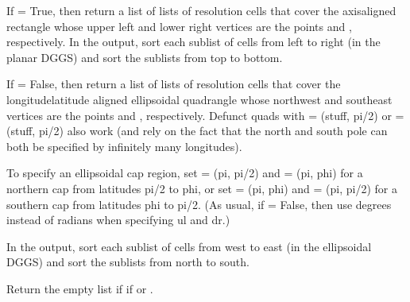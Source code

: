 \documentclass[a4paper,12ptopenany,oneside,english]{sphinxmanual}
\begin{document}
\begin{fulllineitems}
\begin{fulllineitems}
\end{fulllineitems}


\begin{fulllineitems}
\label{\detokenize{dggs:rhealpixdggs.dggs.RHEALPixDGGS.cells_from_region}}
\pysigstartsignatures
\pysiglinewithargsret
{}
{\sphinxparamcomma {}\sphinxparamcomma {}\sphinxparamcomma {}}
{}
\pysigstopsignatures
\sphinxAtStartPar
If  = True, then return a list of lists of resolution
 cells that cover the axis\sphinxhyphen{}aligned rectangle whose
upper left and lower right vertices are the points  and ,
respectively.
In the output, sort each sublist of cells from left to right (in the
planar DGGS) and sort the sublists from top to bottom.

\sphinxAtStartPar
If  = False, then return a list of lists of resolution
cells that cover the longitude\sphinxhyphen{}latitude aligned ellipsoidal quadrangle
whose northwest and southeast vertices are the points  and ,
respectively. Defunct quads with  = (stuff, pi/2) or
 = (stuff, \sphinxhyphen{}pi/2) also work
(and rely on the fact that the north and south pole can both
be specified by infinitely many longitudes).

\sphinxAtStartPar
To specify an ellipsoidal cap region, set  = (\sphinxhyphen{}pi, pi/2) and
 = (\sphinxhyphen{}pi, phi) for a northern cap from latitudes pi/2 to phi, or
set  = (\sphinxhyphen{}pi, phi) and  = (\sphinxhyphen{}pi, \sphinxhyphen{}pi/2) for a southern cap from
latitudes phi to \sphinxhyphen{}pi/2. (As usual, if  = False,
then use degrees instead of radians when specifying ul and dr.)

\sphinxAtStartPar
In the output, sort each sublist of cells from west to east (in the
ellipsoidal DGGS) and sort the sublists from north to south.

\sphinxAtStartPar
Return the empty list if if  or .


\end{fulllineitems}
\end{fulllineitems}
\end{document}

